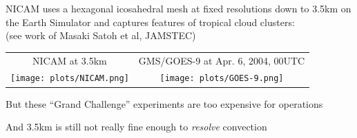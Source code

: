 \begin{slide}{}

\begin{center}
\large
NICAM uses a hexagonal icosahedral mesh at fixed resolutions down to 3.5km on the Earth Simulator and captures features of tropical cloud clusters: \\
(see work of Masaki Satoh et al, JAMSTEC)

\vspace{20pt}
\begin{tabular}{cc}
NICAM at 3.5km & GMS/GOES-9 at Apr. 6, 2004, 00UTC\\
\texttt{[image: plots/NICAM.png]}
&
\texttt{[image: plots/GOES-9.png]}
\end{tabular}

\end{center}

\begin{list0}

    \item But these ``Grand Challenge'' experiments are too expensive for operations

    \item And 3.5km is still not really fine enough to {\it resolve} convection

\end{list0}

\end{slide}
